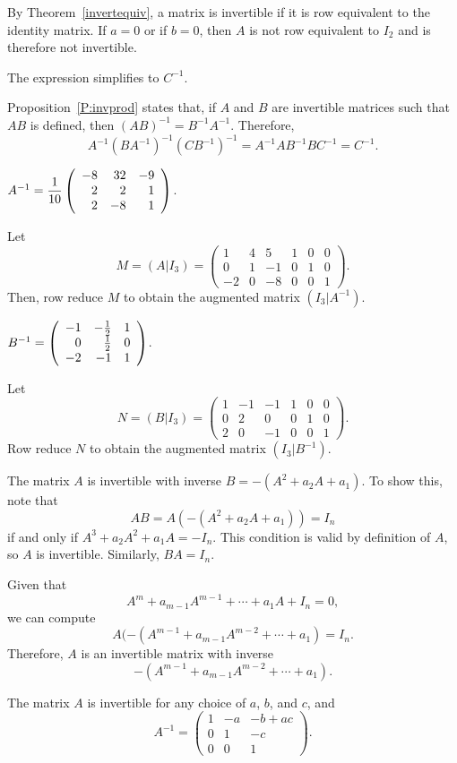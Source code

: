 \soln By Theorem~\ref{invertequiv}, a matrix is invertible if it is row
equivalent to the identity matrix.  If $a = 0$ or if $b = 0$, then
$A$ is not row equivalent to $I_2$ and is therefore not invertible.

\ans The expression simplifies to $C^{-1}$.

\soln Proposition~\ref{P:invprod} states that, if $A$ and $B$ are
invertible matrices such that $AB$ is defined, then $(AB)^{-1} =
B^{-1}A^{-1}$.  Therefore,
\[
A^{-1}(BA^{-1})^{-1}(CB^{-1})^{-1} = A^{-1}AB^{-1}BC^{-1} = C^{-1}.
\]

 \ans
$A^{-1} = \displaystyle\frac{1}{10}\left(\begin{array}{rrr} -8 & 32 & -9 \\ 2 & 2 & 1 \\ 2 & -8 & 1\end{array}\right)$.

\soln Let
\[
M = (A|I_3) = \left(\begin{array}{rrr|rrr} 1 & 4 & 5 & 1 & 0 & 0 \\
0 & 1 & -1 & 0 & 1 & 0 \\
-2 & 0 & -8 & 0 & 0 & 1 \end{array}\right).
\]
Then, row reduce $M$ to obtain the augmented matrix $(I_3|A^{-1})$.

 \ans
$B^{-1} = \left(\begin{array}{rrr} -1 & -\frac{1}{2} & 1 \\ 0 & \frac{1}{2} & 0 \\ -2 & -1 & 1\end{array}\right)$.

\soln Let
\[
N = (B|I_3) = \left(\begin{array}{rrr|rrr} 1 & -1 & -1 & 1 & 0 & 0 \\
0 & 2 & 0 & 0 & 1 & 0 \\ 2 & 0 & -1 & 0 & 0 & 1 \end{array}\right).
\]
Row reduce $N$ to obtain the augmented matrix $(I_3|B^{-1})$.

The matrix $A$ is invertible with inverse $B = -(A^2 + a_2A + a_1)$.
To show this, note that
\[ AB = A(-(A^2 + a_2A + a_1)) = I_n \]
if and only if $A^3 + a_2A^2 + a_1A = -I_n$.  This condition is valid
by definition of $A$, so $A$ is invertible.  Similarly, $BA = I_n$.

Given that
\[
A^m + a_{m - 1}A^{m - 1} + \cdots + a_1A + I_n = 0,
\]
we can compute
\[
A(-(A^{m - 1} + a_{m - 1}A^{m - 2} + \cdots + a_1) = I_n.
\]
Therefore, $A$ is an invertible matrix with inverse
\[
-(A^{m - 1} + a_{m - 1}A^{m - 2} + \cdots + a_1).
\]

\ans
The matrix $A$ is invertible for any choice of $a$, $b$, and $c$, and
\[
A^{-1} = \left(\begin{array}{rrc} 1 & -a & -b + ac \\ 0 & 1 & -c 
\\ 0 & 0 & 1 \end{array}\right).
\]

